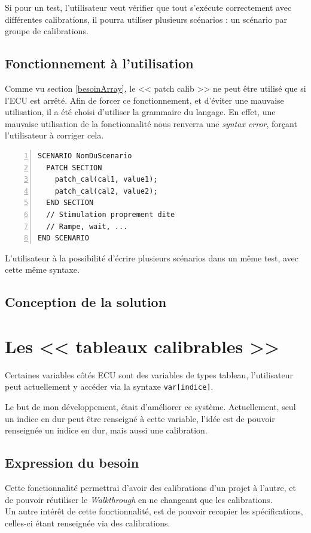 Si pour un test, l'utilisateur veut vérifier que tout s'exécute correctement avec différentes calibrations, il pourra utiliser plusieurs scénarios : un scénario par groupe de calibrations. 

\subsection{Fonctionnement à l'utilisation}
Comme vu section \ref{besoinArray}, le << patch calib >> ne peut être utilisé que si l'ECU est arrêté. Afin de forcer ce fonctionnement, et d'éviter une mauvaise utilisation, il a été choisi d'utiliser la grammaire du langage. En effet, une mauvaise utilisation de la fonctionnalité nous renverra une \textit{syntax error}, forçant l'utilisateur à corriger cela. 

\begin{lstlisting}[language=gtl,numbers=left,caption=Scénario de stimulation contenant des patchs de calibration]
SCENARIO NomDuScenario
  PATCH SECTION
    patch_cal(cal1, value1);
    patch_cal(cal2, value2);
  END SECTION
  // Stimulation proprement dite
  // Rampe, wait, ...
END SCENARIO
\end{lstlisting}
L'utilisateur à la possibilité d'écrire plusieurs scénarios dans un même test, avec cette même syntaxe.

\subsection{Conception de la solution}

\section{Les << tableaux calibrables >>}
Certaines variables côtés ECU sont des variables de types tableau, l’utilisateur peut actuellement y accéder via la syntaxe \texttt{var[indice]}.

Le but de mon développement, était d’améliorer ce système. Actuellement, seul un indice en dur peut être renseigné à cette variable, l’idée est de pouvoir renseignée un indice en dur, mais aussi une calibration.

\subsection{Expression du besoin}\label{besoinTab}
Cette fonctionnalité permettrai d’avoir des calibrations d’un projet à l’autre, et de pouvoir réutiliser le \textit{Walkthrough} en ne changeant que les calibrations.\\
Un autre intérêt de cette fonctionnalité, est de pouvoir recopier les spécifications, celles-ci étant renseignée via des calibrations.

